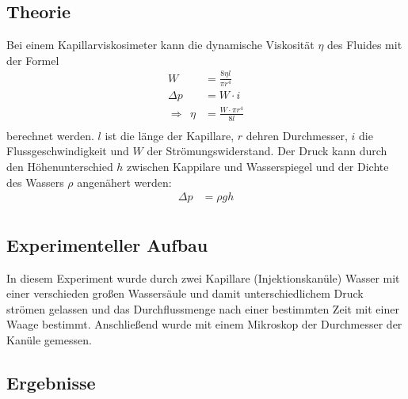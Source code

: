\documentclass[11pt, a4paper]{article}
\begin{document}
    \subsection{Theorie}

    Bei einem Kapillarviskosimeter kann die dynamische Viskosität $\eta$ des Fluides mit der Formel
    \begin{align}
        W &= \frac{8 \eta l}{\pi r^4} \\
        \Delta p &= W \cdot i \\
        \Rightarrow \ \ \eta &= \frac{W \cdot \pi r^4}{8 l} \\
    \end{align}
    berechnet werden. $l$ ist die länge der Kapillare, $r$ dehren Durchmesser, $i$ die Flussgeschwindigkeit und $W$ der
    Strömungswiderstand. Der Druck kann durch den Höhenunterschied $h$ zwischen Kappilare und Wasserspiegel und der Dichte des Wassers $\rho$ angenähert werden:
    \begin{align}
        \Delta p &= \rho g h \\
    \end{align}

    \subsection{Experimenteller Aufbau}

    In diesem Experiment wurde durch zwei Kapillare (Injektionskanüle)
    Wasser mit einer verschieden großen Wassersäule und damit unterschiedlichem Druck strömen gelassen
    und das Durchflussmenge nach einer bestimmten Zeit mit einer Waage bestimmt. Anschließend wurde mit einem
    Mikroskop der Durchmesser der Kanüle gemessen.

    \subsection{Ergebnisse}
\end{document}
